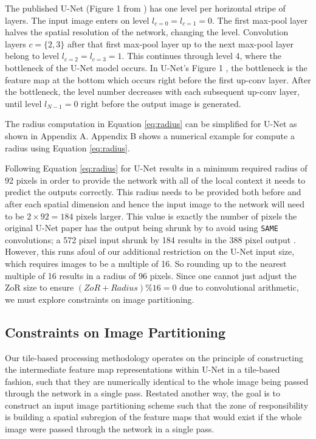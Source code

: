 \documentclass[runningheads]{llncs}
\begin{document}
The published U-Net (Figure 1 from \cite{Ronneberger2015a}) has one level per horizontal stripe of layers. The input image enters on level $l_{c=0} = l_{c=1} = 0$. The first max-pool layer halves the spatial resolution of the network, changing the level. Convolution layers $c = \{2, 3\}$ after that first max-pool layer up to the next max-pool layer belong to level $l_{c=2}=l_{c=3} = 1$. This continues through level 4, where the bottleneck of the U-Net model occurs. In U-Net's Figure 1 \cite{Ronneberger2015a}, the bottleneck is the feature map at the bottom which occurs right before the first up-conv layer. After the bottleneck, the level number decreases with each subsequent up-conv layer, until level $l_{N-1} = 0$ right before the output image is generated. 

The radius computation in Equation \ref{eq:radius} can be simplified for U-Net as shown in Appendix A. Appendix B shows a numerical example for compute a radius using Equation \ref{eq:radius}.

Following Equation \ref{eq:radius} for U-Net results in a minimum required radius of 92 pixels in order to provide the network with all of the local context it needs to predict the outputs correctly. This radius needs to be provided both before and after each spatial dimension and hence the input image to the network will need to be $2 \times 92 = 184$ pixels larger. This value is exactly the number of pixels the original U-Net paper has the output being shrunk by to avoid using \texttt{SAME} convolutions; a 572 pixel input shrunk by 184 results in the 388 pixel output \cite{Ronneberger2015a}. 
However, this runs afoul of our additional restriction on the U-Net input size, which requires images to be a multiple of 16. So rounding up to the nearest multiple of 16 results in a radius of 96 pixels. Since  one cannot just adjust the ZoR size to ensure $(ZoR + Radius) \% 16 = 0$ due to convolutional arithmetic, we must explore constraints on image partitioning. 

\subsection{Constraints on Image Partitioning}

Our tile-based processing methodology operates on the principle of constructing the intermediate feature map representations within U-Net in a tile-based fashion, such that they are numerically identical to the whole image being passed through the network in a single pass. Restated another way, the goal is to construct an input image partitioning scheme such that the zone of responsibility is building a spatial subregion of the feature maps that would exist if the whole image were passed through the network in a single pass. 
\end{document}

